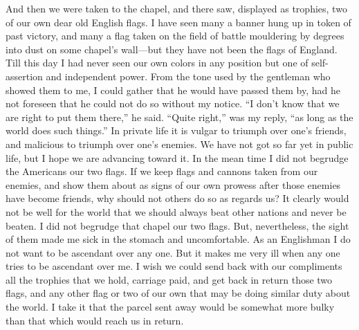 And then we were taken to the chapel, and there saw, displayed as
trophies, two of our own dear old English flags.  I have seen many
a banner hung up in token of past victory, and many a flag taken on
the field of battle mouldering by degrees into dust on some
chapel's wall---but they have not been the flags of England.  Till
this day I had never seen our own colors in any position but one of
self-assertion and independent power.  From the tone used by the
gentleman who showed them to me, I could gather that he would have
passed them by, had he not foreseen that he could not do so without
my notice.  ``I don't know that we are right to put them there,'' he
said.  ``Quite right,'' was my reply, ``as long as the world does such
things.''  In private life it is vulgar to triumph over one's
friends, and malicious to triumph over one's enemies.  We have not
got so far yet in public life, but I hope we are advancing toward
it.  In the mean time I did not begrudge the Americans our two
flags.  If we keep flags and cannons taken from our enemies, and
show them about as signs of our own prowess after those enemies
have become friends, why should not others do so as regards us?  It
clearly would not be well for the world that we should always beat
other nations and never be beaten.  I did not begrudge that chapel
our two flags.  But, nevertheless, the sight of them made me sick
in the stomach and uncomfortable.  As an Englishman I do not want
to be ascendant over any one.  But it makes me very ill when any
one tries to be ascendant over me.  I wish we could send back with
our compliments all the trophies that we hold, carriage paid, and
get back in return those two flags, and any other flag or two of
our own that may be doing similar duty about the world.  I take it
that the parcel sent away would be somewhat more bulky than that
which would reach us in return.

